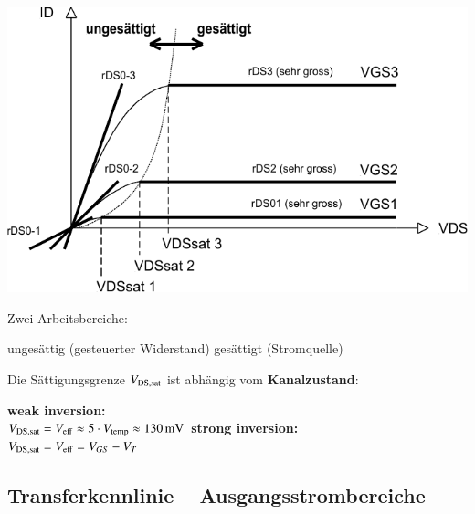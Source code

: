 \begin{minipage}[t]{0.5\columnwidth}
    \includegraphics[width=\columnwidth, align=t]{images/MOSFET_ausgangskennlinien.pdf}
\end{minipage}
\hfill
\begin{minipage}[t]{0.48\columnwidth}
    Zwei Arbeitsbereiche: 

    \begin{outline}
        \1 ungesättig (gesteuerter Widerstand)
        \1 gesättigt (Stromquelle)
    \end{outline}

    \medskip

    Die Sättigungsgrenze $V_{\rm DS, sat}$ ist abhängig vom \textbf{Kanalzustand}:

    \begin{outline}
        \1 \textbf{weak inversion:} \\
            $V_{\rm DS, sat} = V_{\rm eff} \approx 5 \cdot V_{\rm temp} \approx \qty{130}{\milli \volt}$ 
        \1 \textbf{strong inversion:} \\
            $V_{\rm DS, sat} = V_{\rm eff} = V_{GS} - V_T$ 
    \end{outline}
\end{minipage}



\subsection{Transferkennlinie -- Ausgangsstrombereiche}


